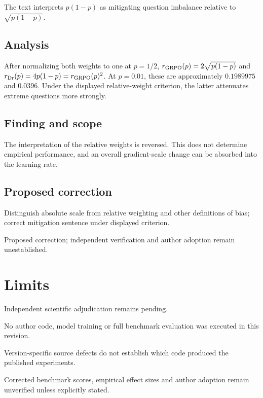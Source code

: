 \documentclass[11pt]{article}
\begin{document}
The text interprets \(p(1-p)\) as mitigating question imbalance relative to \(\sqrt{p(1-p)}\).

\subsection*{Analysis}

After normalizing both weights to one at \(p=1/2\), \(r_{\rm GRPO}(p)=2\sqrt{p(1-p)}\) and \(r_{\rm Dr}(p)=4p(1-p)=r_{\rm GRPO}(p)^2\). At \(p=0.01\), these are approximately \(0.1989975\) and \(0.0396\). Under the displayed relative-weight criterion, the latter attenuates extreme questions more strongly.

\subsection*{Finding and scope}

The interpretation of the relative weights is reversed. This does not determine empirical performance, and an overall gradient-scale change can be absorbed into the learning rate.

\subsection*{Proposed correction}

Distinguish absolute scale from relative weighting and other definitions of bias; correct mitigation sentence under displayed criterion.

Proposed correction; independent verification and author adoption remain unestablished.

\section*{Limits}

Independent scientific adjudication remains pending.\par

No author code, model training or full benchmark evaluation was executed in this revision.\par

Version-specific source defects do not establish which code produced the published experiments.\par

Corrected benchmark scores, empirical effect sizes and author adoption remain unverified unless explicitly stated.\par
\end{document}
